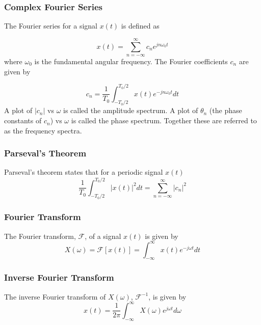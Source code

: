 \documentclass[]{article}
\begin{document}
\begin{multicols}{2}
\subsubsection{Complex Fourier Series}
The Fourier series for a signal $x(t)$ is defined as

\begin{equation} x(t) = \sum_{n=-\infty}^{\infty} c_{n} e^{jn\omega_{0}\label{complex_fourier_series} t}\end{equation}
where $\omega_{0}$ is the fundamental angular frequency.
The Fourier coefficients $c_{n}$ are given by

\begin{equation} c_{n} = \frac{1}{T_{0}} \int_{-T_{0}/2}^{T_{0}/2} x(t) e^{-jn\omega_{0}t} dt\label{complex_fourier_coefs} \end{equation}
A plot of $|c_{n}|$ vs $\omega$ is called the amplitude spectrum. A plot of $\theta_{n}$ (the phase constants of $c_{n}$) vs $\omega$ is called the phase spectrum. Together these are referred to as the frequency spectra.
\subsubsection{Parseval's Theorem}
Parseval's theorem states that for a periodic signal $x(t)$
\begin{equation} \frac{1}{T_{0}} \int_{-T_{0}/2}^{T_{0}/2} |x(t)|^2dt = \sum_{n=-\infty}^{\infty} |c_{n}|^2\label{parsevals_theorem} \end{equation}

\subsubsection{Fourier Transform}
The Fourier transform, $\mathscr{F}$, of a signal $x(t)$ is given by
\begin{equation} X(\omega) = \mathscr{F}[x(t)] = \int_{-\infty}^{\infty}x(t)e^{-j\omega t}dt\label{complex_fourier_transform} \end{equation}

\subsubsection{Inverse Fourier Transform}
The inverse Fourier transform of $X(\omega)$,  $\mathscr{F}^{-1}$, is given by
\begin{equation} x(t) = \frac{1}{2\pi} \int_{-\infty}^{\infty}X(\omega)e^{j\omega t} d\omega\label{inv_complex_fourier_transform} \end{equation}


\end{multicols}
\end{document}
